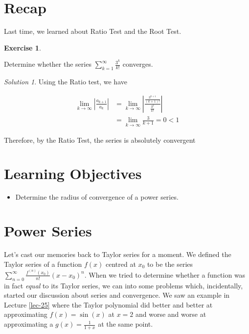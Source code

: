\documentclass[
]{book}
\providecommand{\tightlist}{%
  \setlength{\itemsep}{0pt}\setlength{\parskip}{0pt}}
\theoremstyle{definition}
\theoremstyle{definition}
\theoremstyle{definition}
\newtheorem{exercise}{Exercise}[chapter]
\theoremstyle{definition}
\theoremstyle{remark}
\newtheorem*{solution}{Solution}
\begin{document}
\hypertarget{recap-29}{%
\section{Recap}\label{recap-29}}

Last time, we learned about Ratio Test and the Root Test.

\begin{exercise}
\protect\hypertarget{exr:unlabeled-div-235}{}\label{exr:unlabeled-div-235}

Determine whether the series \(\displaystyle \sum_{k=1}^\infty \frac{3^k}{k!}\) converges.

\end{exercise}

\begin{solution}

Using the Ratio test, we have

\begin{align*}
\lim_{k\to\infty}\left | \frac{a_{k+1}}{a_k}\right| &= \lim_{k\to\infty}\left | \frac{\frac{3^{k+1}}{(k+1)!}}{\frac{3^k}{k!}}\right | \\
&= \lim_{k\to\infty} \frac{3}{k+1} = 0 < 1
\end{align*}

Therefore, by the Ratio Test, the series is absolutely convergent

\end{solution}

\hypertarget{learning-objectives-30}{%
\section{Learning Objectives}\label{learning-objectives-30}}

\begin{itemize}
\tightlist
\item
  Determine the radius of convergence of a power series.
\end{itemize}

\hypertarget{power-series}{%
\section{Power Series}\label{power-series}}

Let's cast our memories back to Taylor series for a moment. We defined the Taylor series of a function \(f(x)\) centred at \(x_0\) to be the series \(\displaystyle \sum_{n=0}^\infty \frac{f^{(n)}(x_0)}{n!}(x-x_0)^n\). When we tried to determine whether a function was in fact \emph{equal} to its Taylor series, we can into some problems which, incidentally, started our discussion about series and convergence. We saw an example in Lecture \ref{lec-25} where the Taylor polynomial did better and better at approximating \(f(x)=\sin(x)\) at \(x=2\) and worse and worse at approximating a \(g(x)=\frac{1}{1+x}\) at the same point.
\end{document}
